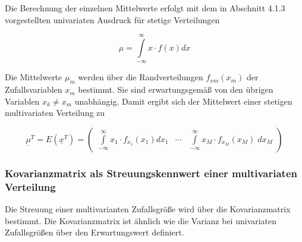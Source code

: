 \noindent Die Berechnung der einzelnen Mittelwerte erfolgt mit dem in Abschnitt 4.1.3 vorgestellten univariaten Ausdruck f\"{u}r stetige Verteilungen

\begin{equation}\label{eq:eighttwentysix}
\mu =\int\limits _{-\infty}^{\infty}x\cdot f(x) dx
\end{equation}

\noindent Die Mittelwerte $\mu_{m}$ werden \"{u}ber die Randverteilungen $f_{xm}(x_{m})$ der Zufallsvariablen $x_{m}$ bestimmt. Sie sind erwartungsgem\"{a}{\ss} von den \"{u}brigen Variablen $x_{k} \neq x_{m}$ unabh\"{a}ngig. Damit ergibt sich der Mittelwert einer stetigen multivariaten Verteilung zu

\begin{equation}\label{eq:eighttwentyseven}
\underline{\mu}^{T}=E\left(\underline{x}^{T}\right)=\left(\begin{array}{ccc} {\int\limits _{-\infty }^{\infty}x_{1} \cdot f_{x_{1}} (x_{1}) dx_{1} } & {\cdots } & {\int\limits _{-\infty }^{\infty}x_{M} \cdot f_{x_{M}} (x_{ M})\; dx_{M}} \end{array}\right)
\end{equation}

\subsubsection{Kovarianzmatrix als Streuungskennwert einer multivariaten Verteilung}

\noindent Die Streuung einer multivarianten Zufallsgr\"{o}{\ss}e wird \"{u}ber die Kovarianzmatrix bestimmt. Die Kovarianzmatrix ist \"{a}hnlich wie die Varianz bei univariaten Zufallsgr\"{o}{\ss}en \"{u}ber den Erwartungswert definiert.

